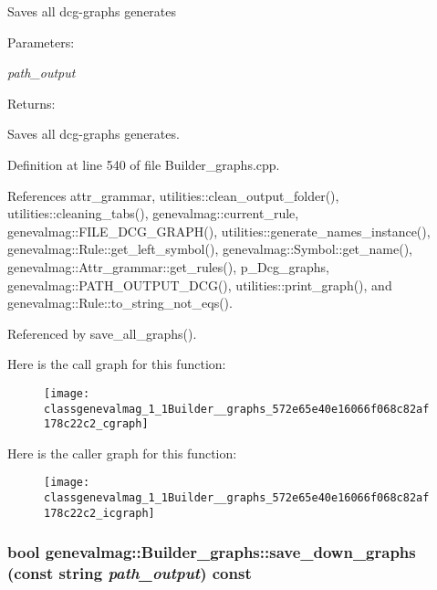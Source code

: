 Saves all dcg-graphs generates \begin{Desc}
\item[Parameters:]
\begin{description}
\item[{\em path\_\-output}]\end{description}
\end{Desc}
\begin{Desc}
\item[Returns:]\end{Desc}
Saves all dcg-graphs generates. 

Definition at line 540 of file Builder\_\-graphs.cpp.

References attr\_\-grammar, utilities::clean\_\-output\_\-folder(), utilities::cleaning\_\-tabs(), genevalmag::current\_\-rule, genevalmag::FILE\_\-DCG\_\-GRAPH(), utilities::generate\_\-names\_\-instance(), genevalmag::Rule::get\_\-left\_\-symbol(), genevalmag::Symbol::get\_\-name(), genevalmag::Attr\_\-grammar::get\_\-rules(), p\_\-Dcg\_\-graphs, genevalmag::PATH\_\-OUTPUT\_\-DCG(), utilities::print\_\-graph(), and genevalmag::Rule::to\_\-string\_\-not\_\-eqs().

Referenced by save\_\-all\_\-graphs().

Here is the call graph for this function:\nopagebreak
\begin{figure}[H]
\begin{center}
\leavevmode
\texttt{[image: classgenevalmag\_1\_1Builder\_\_graphs\_572e65e40e16066f068c82af178c22c2\_cgraph]}
\end{center}
\end{figure}


Here is the caller graph for this function:\nopagebreak
\begin{figure}[H]
\begin{center}
\leavevmode
\texttt{[image: classgenevalmag\_1\_1Builder\_\_graphs\_572e65e40e16066f068c82af178c22c2\_icgraph]}
\end{center}
\end{figure}
\hypertarget{classgenevalmag_1_1Builder__graphs_18516e61124884d50ee9fb14f833ca01}{
\subsubsection[{save\_\-down\_\-graphs}]{\setlength{\rightskip}{0pt plus 5cm}bool genevalmag::Builder\_\-graphs::save\_\-down\_\-graphs (const string {\em path\_\-output}) const}}
\label{classgenevalmag_1_1Builder__graphs_18516e61124884d50ee9fb14f833ca01}


